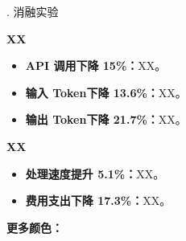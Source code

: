 \begin{frame}{\MakeUppercase{}.{} 消融实验}
    \vspace{-0.5em}

    

    \vspace{-0.5em}

    \begin{block}{\textbf{XX}}
        \begin{itemize}
            \item \textbf{API 调用\textcolor{Green3}{下降 15\%}：}XX。
            \item \textbf{输入 Token\textcolor{Green3}{下降 13.6\%}：}XX。
            \item \textbf{输出 Token\textcolor{Green3}{下降 21.7\%}：}XX。
        \end{itemize}
    \end{block}

    \vspace{-0.5em}

    \begin{block}{\textbf{XX}}
        \begin{itemize}
            \item \textbf{处理速度\textcolor{Green3}{提升 5.1\%}：}XX。
            \item \textbf{费用支出\textcolor{Green3}{下降 17.3\%}：}XX。
        \end{itemize}
    \end{block}

    \textbf{更多颜色：}
    \newline
    \small
\end{frame}
